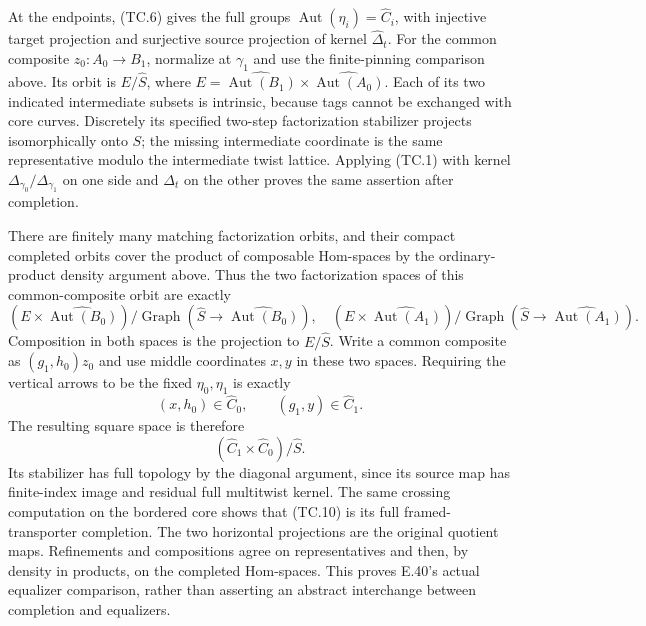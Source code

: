 At the endpoints, (TC.6) gives the full groups
$\operatorname{Aut}(\eta_i)=\widehat C_i$, with injective target
projection and surjective source projection of kernel
$\widehat\Delta_t$.  For the common composite $z_0:A_0\to B_1$,
normalize at $\gamma_1$ and use the finite-pinning comparison above.
Its orbit is $E/\widehat S$, where
$E=\widehat{\operatorname{Aut}(B_1)}\times
\widehat{\operatorname{Aut}(A_0)}$.
Each of its two indicated intermediate subsets is intrinsic, because
tags cannot be exchanged with core curves.  Discretely its specified
two-step factorization stabilizer projects isomorphically onto $S$;
the missing intermediate coordinate is the same representative modulo
the intermediate twist lattice.  Applying (TC.1) with kernel
$\Delta_{\gamma_0}/\Delta_{\gamma_1}$ on one side and $\Delta_t$
on the other proves the same assertion after completion.

There are finitely many matching factorization orbits, and their compact
completed orbits cover the product of composable Hom-spaces by the
ordinary-product density argument above.  Thus the two factorization
spaces of this common-composite orbit are exactly
\[
 (E\times\widehat{\operatorname{Aut}(B_0)})/
       \operatorname{Graph}(\widehat S\to
                          \widehat{\operatorname{Aut}(B_0)}),
\quad
 (E\times\widehat{\operatorname{Aut}(A_1)})/
       \operatorname{Graph}(\widehat S\to
                          \widehat{\operatorname{Aut}(A_1)}).
                                                               \tag{TC.9}
\]
Composition in both spaces is the projection to $E/\widehat S$.
Write a common composite as $(g_1,h_0)z_0$ and use middle coordinates
$x,y$ in these two spaces.  Requiring the vertical arrows to be the
fixed $\eta_0,\eta_1$ is exactly
\[
                 (x,h_0)\in\widehat C_0,
                  \qquad(g_1,y)\in\widehat C_1.
\]
The resulting square space is therefore
\[
                 (\widehat C_1\times\widehat C_0)/\widehat S.
                                                               \tag{TC.10}
\]
Its stabilizer has full topology by the diagonal argument, since its
source map has finite-index image and residual full multitwist kernel.
The same crossing computation on the bordered core shows that (TC.10)
is its full framed-transporter completion.  The two horizontal
projections are the original quotient maps.  Refinements and
compositions agree on representatives and then, by density in products,
on the completed Hom-spaces.  This proves E.40's actual equalizer
comparison, rather than asserting an abstract interchange between
completion and equalizers.

